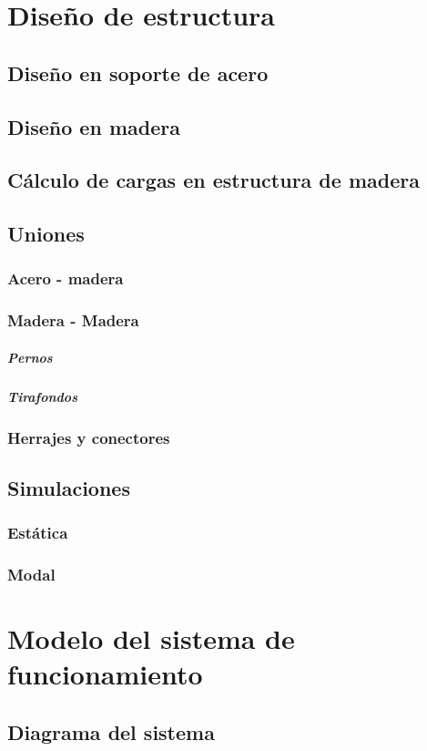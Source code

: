 \section{Diseño de estructura}
\subsection{Diseño en soporte de acero}

\subsection{Diseño en madera}

\subsection{Cálculo de cargas en estructura de madera}

\subsection{Uniones}
\subsubsection{Acero - madera}
\subsubsection{Madera - Madera}
\subparagraph{Pernos}
\subparagraph{Tirafondos}
\subsubsection{Herrajes y conectores}

\subsection{Simulaciones}
\subsubsection{Estática}
\subsubsection{Modal}


\section{Modelo del sistema de funcionamiento}
\subsection{Diagrama del sistema}

